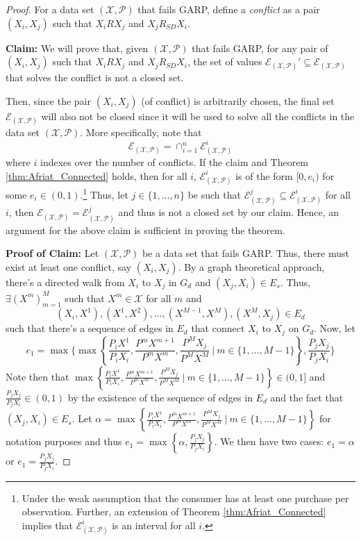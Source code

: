 \documentclass{article} %
\theoremstyle{style1}
\theoremstyle{example}
\begin{document}
\AfriatNonCompact*
\begin{proof}
For a data set $(\mathcal{X},\mathcal{P})$ that fails GARP, define a \emph{conflict} as a pair $(X_i,X_j)$ such that $X_i R X_j$ and $X_j R_{SD} X_i$. 

\textbf{Claim:} We will prove that, given $(\mathcal{X},\mathcal{P})$ that fails GARP, for any pair of $(X_i,X_j)$ such that $X_i R X_j$ and $X_j R_{SD} X_i$, the set of values $\mathcal{E}_{(\mathcal{X},\mathcal{P})}'\subseteq \mathcal{E}_{(\mathcal{X},\mathcal{P})}$ that solves the conflict is not a closed set. 

Then, since the pair $(X_i,X_j)$ (of conflict) is arbitrarily chosen, the final set $\mathcal{E}_{(\mathcal{X},\mathcal{P})}$ will also not be closed since it will be used to solve all the conflicts in the data set $(\mathcal{X},\mathcal{P})$. More specifically, note that $$\mathcal{E}_{(\mathcal{X},\mathcal{P})}=\cap_{i=1}^n \mathcal{E}^i_{(\mathcal{X},\mathcal{P})}$$ where $i$ indexes over the number of conflicts. If the claim and Theorem \ref{thm:Afriat_Connected} holds, then for all $i$, $\mathcal{E}^i_{(\mathcal{X},\mathcal{P})}$ is of the form $[0,e_i)$ for some $e_i\in(0,1)$.\footnote{Under the weak assumption that the consumer has at least one purchase per observation. Further, an extension of Theorem \ref{thm:Afriat_Connected} implies that $\mathcal{E}^i_{(\mathcal{X},\mathcal{P})}$ is an interval for all $i$.} Thus, let $j\in\{1,\ldots,n\}$ be such that $\mathcal{E}^j_{(\mathcal{X},\mathcal{P})}\subseteq \mathcal{E}^i_{(\mathcal{X},\mathcal{P})}$ for all $i$, then $\mathcal{E}_{(\mathcal{X},\mathcal{P})}=\mathcal{E}^j_{(\mathcal{X},\mathcal{P})}$ and thus is not a closed set by our claim. Hence, an argument for the above claim is sufficient in proving the theorem.

\textbf{Proof of Claim:} Let $(\mathcal{X},\mathcal{P})$ be a data set that fails GARP. Thus, there must exist at least one conflict, say $(X_i,X_j)$. By a graph theoretical approach, there's a directed walk from $X_i$ to $X_j$ in $G_d$ and $(X_j,X_i)\in E_s$. Thus, $\exists (X^m)_{m=1}^M$ such that $X^m\in\mathcal{X}$ for all $m$ and $$(X_i,X^1),(X^1,X^2),\ldots, (X^{M-1},X^M), (X^M, X_j)\in E_d$$ such that there's a sequence of edges in $E_d$ that connect $X_i$ to $X_j$ on $G_d$. Now, let 
$$e_1=\max\Bigg\{\max\left\{\frac{P_iX^1}{P_iX_i},\frac{P^mX^{m+1}}{P^mX^m},\frac{P^MX_j}{P^MX^M}\ |\ m\in\{1,\ldots, M-1\}\right\}, \frac{P_jX_j}{P_jX_i}\Bigg\}$$
Note then that $\max\left\{\frac{P_iX^1}{P_iX_i},\frac{P^mX^{m+1}}{P^mX^m},\frac{P^MX_j}{P^MX^M}\ |\ m\in\{1,\ldots, M-1\}\right\}\in(0,1]$ and $\frac{P_jX_j}{P_jX_i}\in(0,1)$ by the existence of the sequence of edges in $E_d$ and the fact that $(X_j,X_i)\in E_s$. Let $\alpha=\max\left\{\frac{P_iX^1}{P_iX_i},\frac{P^mX^{m+1}}{P^mX^m},\frac{P^MX_j}{P^MX^M}\ |\ m\in\{1,\ldots, M-1\}\right\}$ for notation purposes and thus $e_1=\max\left\{\alpha, \frac{P_jX_j}{P_jX_i}\right\}$. We then have two cases: $e_1=\alpha$ or $e_1=\frac{P_jX_j}{P_jX_i}$.
\end{proof}



\end{document}
